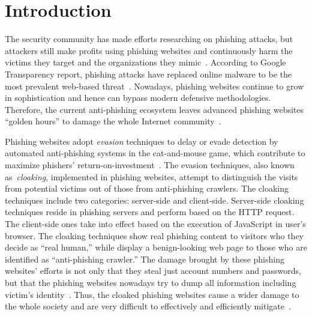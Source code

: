 \section{Introduction}

The security community has made efforts researching on phishing attacks,
but attackers still make profits using phishing websites and continuously harm the victims they target and the organizations they mimic~\cite{ho2019detecting, van2019cognitive}.
According to Google Transparency report, phishing attacks have replaced online malware to be the most prevalent web-based threat~\cite{googletransparencyreport, solutions2019verizon}.
Nowadays, phishing websites continue to grow in sophistication and hence can bypass modern defensive methodologies.
Therefore, the current anti-phishing ecosystem leaves advanced phishing websites ``golden hours'' to damage the whole Internet community~\cite{oest2020sunrise}.

Phishing websites adopt \emph{evasion} techniques to delay or evade detection by automated anti-phishing systems in the cat-and-mouse game,
which contribute to maximize phishers' return-on-investment~\cite{thomas2017data}.
The evasion techniques, also known as~\emph{cloaking}, implemented in phishing websites, attempt to distinguish the visits from potential victims out of those from anti-phishing crawlers.
The cloaking techniques include two categories: server-side and client-side.
Server-side cloaking techniques reside in phishing servers and perform based on the HTTP request.
The client-side ones take into effect based on the execution of JavaScript in user's browser.
The cloaking techniques show real phishing content to visitors who they decide as ``real human,'' while display a benign-looking web page to those who are identified as ``anti-phishing crawler.''
The damage brought by these phishing websites' efforts is not only that they steal just account numbers and passwords,
but that the phishing websites nowadays try to dump all information including victim's identity~\cite{thomas2017data}.
Thus, the cloaked phishing websites cause a wider damage to the whole society and are very difficult to effectively and efficiently mitigate~\cite{oest2020sunrise, zhang2021crawlphish}.


